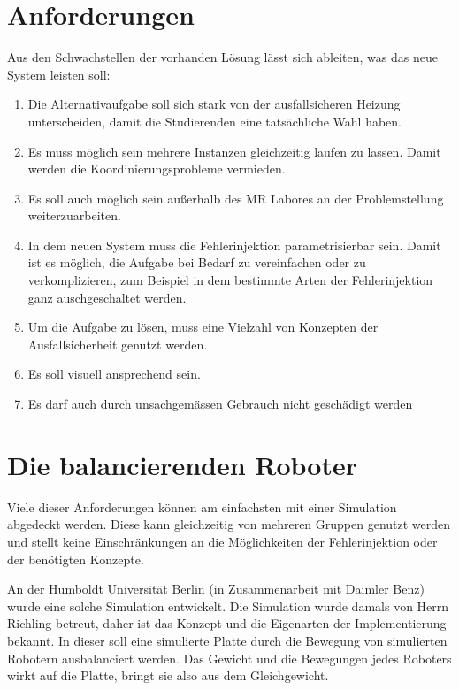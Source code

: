 \section{Anforderungen}\label{anforderung}
Aus den Schwachstellen der vorhanden L{\"{o}}sung l{\"{a}}sst sich ableiten, was das neue System leisten soll:
\begin{enumerate}
	\item Die Alternativaufgabe soll sich stark von der ausfallsicheren Heizung unterscheiden, damit die Studierenden eine tats{\"{a}}chliche Wahl haben.
	\item Es muss m{\"{o}}glich sein mehrere Instanzen gleichzeitig laufen zu lassen. Damit werden die Koordinierungsprobleme vermieden.
	\item Es soll auch m{\"{o}}glich sein au{\ss}erhalb des MR Labores an der Problemstellung weiterzuarbeiten.
	\item In dem neuen System muss die Fehlerinjektion parametrisierbar sein. Damit ist es m{\"{o}}glich,
		die Aufgabe bei Bedarf zu vereinfachen oder zu verkomplizieren, zum Beispiel in dem bestimmte
		Arten der Fehlerinjektion ganz auschgeschaltet werden.
	\item Um die Aufgabe zu l{\"{o}}sen, muss eine Vielzahl von Konzepten der Ausfallsicherheit genutzt werden.
	\item Es soll visuell ansprechend sein.
	\item Es darf auch durch unsachgem{\"{a}}ssen Gebrauch nicht gesch{\"{a}}digt werden
\end{enumerate}

\clearpage
\section{Die balancierenden Roboter}
Viele dieser Anforderungen k{\"{o}}nnen am einfachsten mit einer Simulation abgedeckt werden. Diese kann gleichzeitig
von mehreren Gruppen genutzt werden und stellt keine Einschr{\"{a}}nkungen an die M{\"{o}}glichkeiten der Fehlerinjektion
oder der ben{\"{o}}tigten Konzepte.

An der Humboldt Universit{\"{a}}t Berlin (in Zusammenarbeit mit Daimler Benz) wurde eine solche
Simulation\cite{Werner00} entwickelt. Die Simulation wurde damals von Herrn Richling betreut, daher ist das Konzept
und die Eigenarten der Implementierung bekannt. In dieser soll eine simulierte Platte durch die Bewegung von 
simulierten Robotern ausbalanciert werden. Das Gewicht und die Bewegungen jedes Roboters wirkt auf die Platte, bringt
sie also aus dem Gleichgewicht.

